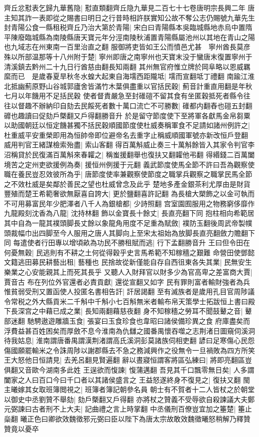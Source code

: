 齊丘忿懟表乞歸九華舊隐|{
	懟直類翻齊丘隐九華見二百七十七卷唐明宗長興二年}
唐主知其詐一表即從之賜書曰明日之行昔時相許朕實知公故不奪公志仍賜號九華先生封青陽公食一縣租税齊丘乃治大第於青陽|{
	宋白曰青陽縣本吳臨城縣地赤烏中置隋平陳廢臨城縣為南陵縣唐天寶元年分涇南陵秋浦置青陽縣屬池州以其地在青山之陽也九域志在州東南一百里治直之翻}
服御將吏皆如王公而憤邑尤甚　寧州酋長莫彦殊以所部温那等十八州附于楚|{
	寧州即唐之南寧州也天寶末没于蠻唐末復置寧州于清溪鎮去黔州二十九日行酋慈由翻長知兩翻}
其州無官府惟立牌於岡阜略以恩威羈縻而已　是歲春夏旱秋冬水蝗大起東自海壖西距隴坻|{
	壖而宣翻坻丁禮翻}
南踰江淮北抵幽薊原野山谷城郭廬舍皆滿竹木葉俱盡重以官括民穀|{
	薊音計重直用翻是年秋七月以年饑用不足括民穀}
使者督責嚴急至封碓磑不留其食有坐匿穀抵死者縣令往往以督趣不辦納印自劾去民餒死者數十萬口流亡不可勝數|{
	碓都内翻舂也磑五封翻䃺也趣讀曰促劾戶槩翻又戶得翻勝音升}
於是留守節度使下至將軍各獻馬金帛芻粟以助國朝廷以恒定饑甚獨不括民穀順國節度使杜威奏稱軍食不足請如諸州例許之|{
	杜重威平安重榮即用為恒帥帝即位避帝名去重字止稱威順國軍號亦新改恒戶登翻}
威用判官王緒謀檢索殆盡|{
	索山客翻}
得百萬斛威止奏三十萬斛餘皆入其家令判官李沼稱貸於民復滿百萬斛來春糶之|{
	稱蚩援翻舉也復扶又翻糶他弔翻}
得緡錢二百萬闔境苦之定州吏欲援例為奏|{
	援恒州例援于元翻}
義武節度使馬全節不許曰吾為觀察使職在養民豈忍效彼所為乎|{
	唐節度使率兼觀察使節度之職掌兵觀察之職掌民馬全節之不效杜威是矣鄰於善民之望也杜威曾念及此乎}
楚地多產金銀茶利尤厚由是財貨豐殖而楚王希範奢欲無厭喜自誇大|{
	更於鹽翻喜許記翻}
為長槍大槊飾之以金可執而不可用募富民年少肥澤者八千人為銀槍都|{
	少詩照翻}
宫室園囿服用之物務窮侈靡作九龍殿刻沈香為八龍|{
	沈持林翻}
飾以金寶長十餘丈|{
	長直亮翻下同}
抱柱相向希範居其中自為一龍其襆頭脚長丈餘以象龍角用度不足重為賦斂|{
	襆防玉翻後周武帝製幞頭裁幅巾出四脚至今人服用之唐人其脚向上至宋太祖始為放脚長直亮翻斂力贍翻下同}
每遣使者行田專以增頃畝為功民不勝租賦而逃|{
	行下孟翻勝音升}
王曰但令田在何憂無穀|{
	民逃則有不耕之土何從得穀乎史言馬希範不知稼穡之艱難}
命營田使鄧懿文籍逃田募民耕藝出租|{
	藝種也}
民捨故從新僅能自存自西徂東各失其業|{
	民無安生樂業之心安能親其上而死其長乎}
又聽人入財拜官以財多少為官高卑之差富商大賈|{
	賈音古}
布在列位外官還者必責貢獻|{
	還從宣翻又如字}
民有罪則富者輸財強者為兵惟貧弱受刑又置函使人投匿名書相告訐|{
	訐居謁翻}
至有滅族者是歲用孔目官周陟議令常税之外大縣貢米二千斛中千斛小七百斛無米者輸布帛天策學士拓跋恒上書曰殿下長深宫之中藉已成之業|{
	長知兩翻藉慈夜翻}
身不知稼穡之勞耳不聞鼓鼙之音|{
	鼙部迷翻}
馳騁遨遊雕牆玉食|{
	張宴曰玉食珍食也韋昭曰諸侯備珍異之食}
府庫盡矣而浮費益甚百姓困矣而厚斂不息今淮南為仇讎之國番禺懷吞噬之志荆渚日圖窺伺溪洞待我姑息|{
	淮南謂唐番禺謂漢荆渚謂高氏溪洞彭莫諸族伺相吏翻}
諺曰足寒傷心民怨傷國願罷輸米之令誅周陟以謝郡縣去不急之務減興作之役無令一旦禍敗為四方所笑王大怒他日恒請見|{
	去羌呂翻見賢遍翻}
辭以晝寢恒謂客將區弘練曰|{
	將即亮翻區豈俱翻又音歐今湖南多此姓}
王逞欲而愎諫|{
	愎蒲邁翻}
吾見其千口飄零無日矣|{
	人多謂闔家之人曰百口今曰千口者以其諸侯盛言之}
王益怒遂終身不復見之|{
	復扶又翻}
閩主曦嫁其女取班簿閲視之|{
	班簿者簿記朝參名員}
朝士有不賀者十二人皆杖之於朝堂以御史中丞劉贊不舉劾|{
	劾戶槩翻又戶得翻}
亦將杖之贊義不受辱欲自殺諫議大夫鄭元弼諫曰古者刑不上大夫|{
	記曲禮之言上時掌翻}
中丞儀刑百僚豈宜加之箠楚|{
	箠止橤翻}
曦正色曰卿欲效魏徵邪元弼曰臣以陛下為唐太宗故敢效魏徵曦怒稍解乃釋贊贊竟以憂卒


